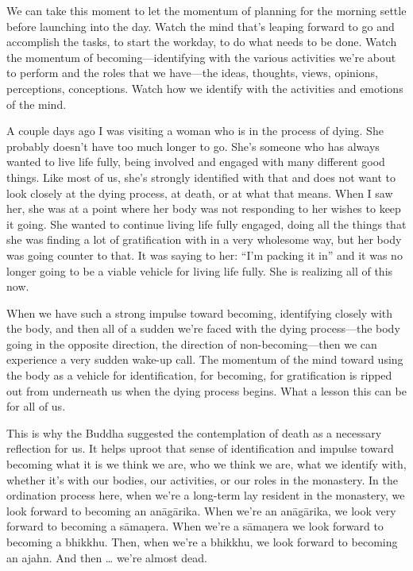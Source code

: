 
We can take this moment to let the momentum of planning for the morning 
settle before launching into the day. Watch the mind that's leaping 
forward to go and accomplish the tasks, to start the workday, to do 
what needs to be done. Watch the momentum of becoming---identifying 
with the various activities we're about to perform and the roles that 
we have---the ideas, thoughts, views, opinions, perceptions, 
conceptions. Watch how we identify with the activities and emotions of 
the mind.

A couple days ago I was visiting a woman who is in the process of 
dying. She probably doesn't have too much longer to go. She's someone 
who has always wanted to live life fully, being involved and engaged 
with many different good things. Like most of us, she's strongly 
identified with that and does not want to look closely at the dying 
process, at death, or at what that means. When I saw her, she was at a 
point where her body was not responding to her wishes to keep it going. 
She wanted to continue living life fully engaged, doing all the things 
that she was finding a lot of gratification with in a very wholesome 
way, but her body was going counter to that. It was saying to her: 
``I'm packing it in'' and it was no longer going to be a viable vehicle 
for living life fully. She is realizing all of this now.

When we have such a strong impulse toward becoming, identifying closely 
with the body, and then all of a sudden we're faced with the dying 
process---the body going in the opposite direction, the direction of 
non-becoming---then we can experience a very sudden wake-up call. The 
momentum of the mind toward using the body as a vehicle for 
identification, for becoming, for gratification is ripped out from 
underneath us when the dying process begins. What a lesson this can be 
for all of us.

This is why the Buddha suggested the contemplation of death as a 
necessary reflection for us. It helps uproot that sense of 
identification and impulse toward becoming what it is we think we are, 
who we think we are, what we identify with, whether it's with our 
bodies, our activities, or our roles in the monastery. In the 
ordination process here, when we're a long-term lay resident in the 
monastery, we look forward to becoming an anāgārika. When we're an 
anāgārika, we look very forward to becoming a sāmaṇera. When we're 
a sāmaṇera we look forward to becoming a bhikkhu. Then, when we're a 
bhikkhu, we look forward to becoming an ajahn. And then … we're 
almost dead.

